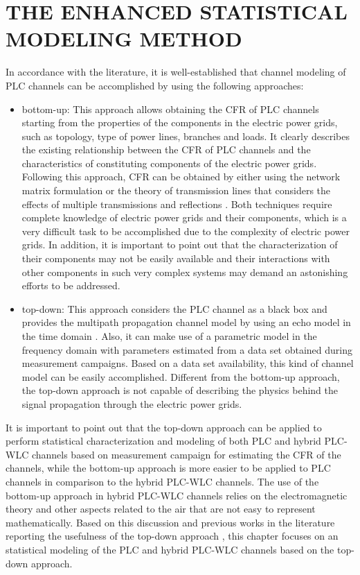 \chapter{THE ENHANCED STATISTICAL MODELING METHOD} \label{Proposal}

In accordance with the literature, it is well-established that channel modeling of \ac{PLC} channels can be accomplished by using the following approaches:

\begin{itemize}
\item bottom-up: This approach allows obtaining the \ac{CFR} of \ac{PLC} channels starting from the properties of the components in the electric power grids, such as topology, type of power lines, branches and loads. It clearly describes the existing relationship between the \ac{CFR} of \ac{PLC} channels and the characteristics of constituting components of the electric power grids. Following this approach, \ac{CFR} can be obtained by either using the network matrix formulation \cite{Chen:botu} or the theory of transmission lines that considers the  effects of multiple transmissions and reflections \cite{Anasta:botu}. Both techniques require complete knowledge of electric power grids and their components, which is a very difficult task to be accomplished due to the complexity of electric power grids. In addition, it is important to point out that the characterization of their components may not be easily available and their interactions with other components in such very complex systems may demand an astonishing efforts to be addressed. 

\item top-down: This approach considers the \ac{PLC} channel as a black box and provides the multipath propagation channel model by using an echo model in the time domain \cite{tang:topd}. Also, it can make use of a parametric model in the frequency domain \cite{Zimmermann} with parameters estimated from a data set obtained during measurement campaigns. Based on a data set availability, this kind of channel model can be easily accomplished. Different from the bottom-up approach, the top-down approach is not capable of describing the physics behind the signal propagation through the electric power grids.
\end{itemize}

It is important to point out that the top-down approach can be applied to perform statistical characterization and modeling of both \ac{PLC} and hybrid \ac{PLC}-\ac{WLC} channels based on  measurement campaign for estimating the \ac{CFR} of the channels, while the bottom-up approach is more easier to be applied to \ac{PLC} channels in comparison to the hybrid \ac{PLC}-\ac{WLC} channels. The use of the bottom-up approach in hybrid \ac{PLC}-\ac{WLC} channels relies on the electromagnetic theory and other aspects related to the air that are not easy to represent mathematically. Based on this discussion and previous works in the literature reporting the usefulness of the top-down approach \cite{topd2007}, this chapter focuses on an statistical modeling of the \ac{PLC} and hybrid \ac{PLC}-\ac{WLC} channels based on the top-down approach.

